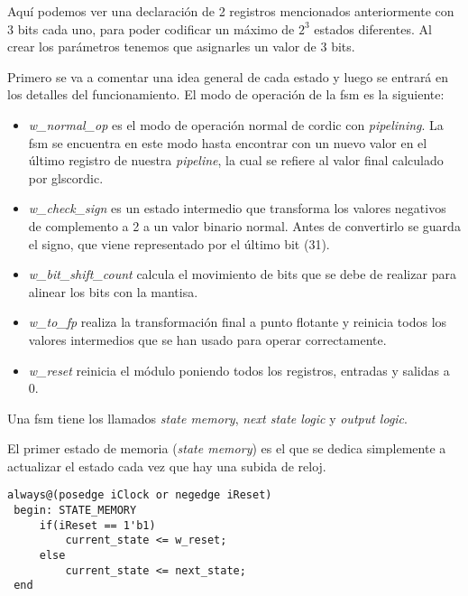 Aquí podemos ver una declaración de 2 registros mencionados anteriormente con 3 bits cada uno, para poder codificar un máximo de $2^3$ estados diferentes. Al crear los parámetros tenemos que asignarles un valor de 3 bits.

Primero se va a comentar una idea general de cada estado y luego se entrará en los detalles del funcionamiento. El modo de operación de la \gls{fsm} es la siguiente:

\begin{itemize}
	\item \textit{w\_normal\_op} es el modo de operación normal de \gls{cordic} con \textit{pipelining}. La \gls{fsm} se encuentra en este modo hasta encontrar con un nuevo valor en el último registro de nuestra \textit{pipeline}, la cual se refiere al valor final calculado por gls{cordic}.
	
	\item \textit{w\_check\_sign} es un estado intermedio que transforma los valores negativos de complemento a 2 a un valor binario normal. Antes de convertirlo se guarda el signo, que viene representado por el último bit (31).
	
	\item \textit{w\_bit\_shift\_count} calcula el movimiento de bits que se debe de realizar para alinear los bits con la mantisa.
	
	\item \textit{w\_to\_fp} realiza la transformación final a punto flotante y reinicia todos los valores intermedios que se han usado para operar correctamente.
	
	\item \textit{w\_reset} reinicia el módulo poniendo todos los registros, entradas y salidas a 0.
	
\end{itemize}

Una \gls{fsm} tiene los llamados \textit{state memory}, \textit{next state logic} y \textit{output logic}.

El primer estado de memoria (\textit{state memory}) es el que se dedica simplemente a actualizar el estado cada vez que hay una subida de reloj.

\begin{lstlisting}[caption={\textit{state memory} de \gls{cordic}}]
always@(posedge iClock or negedge iReset)
 begin: STATE_MEMORY
     if(iReset == 1'b1)
         current_state <= w_reset;
     else
         current_state <= next_state;
 end
\end{lstlisting}

